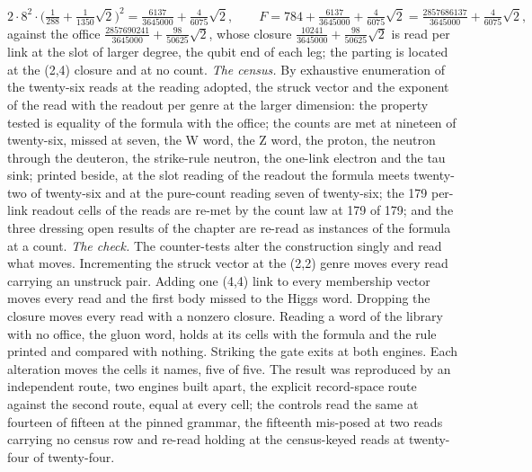 \begin{chproof}
\begin{equation} 2\cdot 8^{2}\cdot\Big(\tfrac{1}{288} + \tfrac{1}{1350}\sqrt{2}\Big)^{2} = \tfrac{6137}{3645000} + \tfrac{4}{6075}\sqrt{2}, \qquad F = 784 + \tfrac{6137}{3645000} + \tfrac{4}{6075}\sqrt{2} = \tfrac{2857686137}{3645000} + \tfrac{4}{6075}\sqrt{2}, \end{equation}
against the office $\tfrac{2857690241}{3645000} + \tfrac{98}{50625}\sqrt{2}$, whose closure $\tfrac{10241}{3645000} + \tfrac{98}{50625}\sqrt{2}$ is read per link at the slot of larger degree, the qubit end of each leg; the parting is located at the (2,4) closure and at no count.
\textit{The census.} By exhaustive enumeration of the twenty-six reads at the reading adopted, the struck vector and the exponent of the read with the readout per genre at the larger dimension: the property tested is equality of the formula with the office; the counts are met at nineteen of twenty-six, missed at seven, the W word, the Z word, the proton, the neutron through the deuteron, the strike-rule neutron, the one-link electron and the tau sink; printed beside, at the slot reading of the readout the formula meets twenty-two of twenty-six and at the pure-count reading seven of twenty-six; the 179 per-link readout cells of the reads are re-met by the count law at 179 of 179; and the three dressing open results of the chapter are re-read as instances of the formula at a count.
\textit{The check.} The counter-tests alter the construction singly and read what moves. Incrementing the struck vector at the (2,2) genre moves every read carrying an unstruck pair. Adding one (4,4) link to every membership vector moves every read and the first body missed to the Higgs word. Dropping the closure moves every read with a nonzero closure. Reading a word of the library with no office, the gluon word, holds at its cells with the formula and the rule printed and compared with nothing. Striking the gate exits at both engines. Each alteration moves the cells it names, five of five. The result was reproduced by an independent route, two engines built apart, the explicit record-space route against the second route, equal at every cell; the controls read the same at fourteen of fifteen at the pinned grammar, the fifteenth mis-posed at two reads carrying no census row and re-read holding at the census-keyed reads at twenty-four of twenty-four.
\end{chproof}
\par\medskip{}\label{narr:close:8-1}\par
